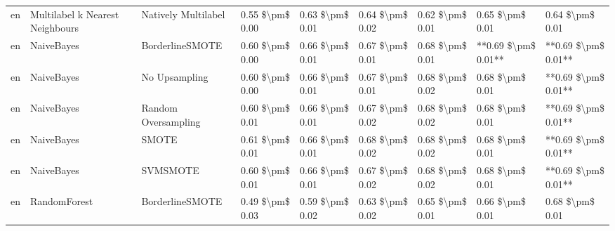 \begin{tabular}{lllllllll}
      en & Multilabel k Nearest Neighbours &           Natively Multilabel & 0.55 \$\textbackslash pm\$ 0.00 &           0.63 \$\textbackslash pm\$ 0.01 &       0.64 \$\textbackslash pm\$ 0.02 &        0.62 \$\textbackslash pm\$ 0.01 &                         0.65 \$\textbackslash pm\$ 0.01 &     0.64 \$\textbackslash pm\$ 0.01 \\
      en &                      NaiveBayes &               BorderlineSMOTE & 0.60 \$\textbackslash pm\$ 0.00 &           0.66 \$\textbackslash pm\$ 0.01 &       0.67 \$\textbackslash pm\$ 0.01 &        0.68 \$\textbackslash pm\$ 0.01 &                     **0.69 \$\textbackslash pm\$ 0.01** & **0.69 \$\textbackslash pm\$ 0.01** \\
      en &                      NaiveBayes &                 No Upsampling & 0.60 \$\textbackslash pm\$ 0.00 &           0.66 \$\textbackslash pm\$ 0.01 &       0.67 \$\textbackslash pm\$ 0.01 &        0.68 \$\textbackslash pm\$ 0.02 &                         0.68 \$\textbackslash pm\$ 0.01 & **0.69 \$\textbackslash pm\$ 0.01** \\
      en &                      NaiveBayes &           Random Oversampling & 0.60 \$\textbackslash pm\$ 0.01 &           0.66 \$\textbackslash pm\$ 0.01 &       0.67 \$\textbackslash pm\$ 0.02 &        0.68 \$\textbackslash pm\$ 0.02 &                         0.68 \$\textbackslash pm\$ 0.01 & **0.69 \$\textbackslash pm\$ 0.01** \\
      en &                      NaiveBayes &                         SMOTE & 0.61 \$\textbackslash pm\$ 0.01 &           0.66 \$\textbackslash pm\$ 0.01 &       0.68 \$\textbackslash pm\$ 0.02 &        0.68 \$\textbackslash pm\$ 0.02 &                         0.68 \$\textbackslash pm\$ 0.01 & **0.69 \$\textbackslash pm\$ 0.01** \\
      en &                      NaiveBayes &                      SVMSMOTE & 0.60 \$\textbackslash pm\$ 0.01 &           0.66 \$\textbackslash pm\$ 0.01 &       0.67 \$\textbackslash pm\$ 0.02 &        0.68 \$\textbackslash pm\$ 0.02 &                         0.68 \$\textbackslash pm\$ 0.01 & **0.69 \$\textbackslash pm\$ 0.01** \\
      en &                    RandomForest &               BorderlineSMOTE & 0.49 \$\textbackslash pm\$ 0.03 &           0.59 \$\textbackslash pm\$ 0.02 &       0.63 \$\textbackslash pm\$ 0.02 &        0.65 \$\textbackslash pm\$ 0.01 &                         0.66 \$\textbackslash pm\$ 0.01 &     0.68 \$\textbackslash pm\$ 0.01 \\

\end{tabular}
